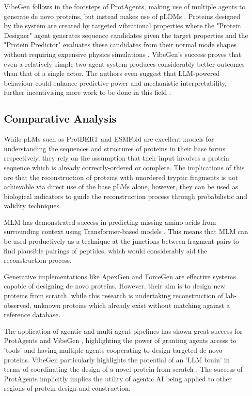 \documentclass[journal]{IEEEtran}
\begin{document}
VibeGen follows in the footsteps of ProtAgents, making use of multiple agents to generate de novo proteins,
but instead makes use of pLDMs \cite{ni2025agenticendtoendnovoprotein}.
Proteins designed by the system are created by targeted vibrational properties where the "Protein Designer"
agent generates sequence candidates given the target properties and the "Protein Predictor" evaluates these
candidates from their normal mode shapes without requiring expensive physics simulations \cite{ni2025agenticendtoendnovoprotein}.
VibeGen's success proves that even a relatively simple two-agent system produces 
considerably better outcomes than that of a single actor. The authors even suggest that LLM-powered behaviour could
enhance predictive power and mechanistic interpretability, further incentivising more work to be done in
this field \cite{ni2025agenticendtoendnovoprotein}.

\subsection{Comparative Analysis}
While pLMs such as ProtBERT \cite{9477085} and ESMFold \cite{lin2023esmfold} are excellent models
for understanding the sequences and structures of proteins in their base forms respectively, they rely on the assumption that their 
input involves a protein sequence which is already correctly-ordered or complete. The implications of this are that the 
reconstruction of proteins with unordered tryptic fragments is not achievable
via direct use of the base pLMs alone, however, they can be used as biological indicators
to guide the reconstruction process through probabilistic and validity techniques.

MLM has demonstrated success in predicting missing amino acids from surrounding
context using Transformer-based models \cite{kharkar2024llmproteins}. This means that
MLM can be used productively as a technique at the junctions between fragment pairs to find plausible pairings of peptides, 
which would considerably aid the reconstruction process.

Generative implementations like ApexGen \cite{xia2025apexgensimultaneousdesignpeptide} and
ForceGen \cite{doi:10.1126/sciadv.adl4000} are effective systems capable of designing de novo
proteins. However, their aim is to design new proteins from scratch, while this research is undertaking
reconstruction of lab-observed, unknown proteins which already exist without matching against a reference database.

The application of agentic and multi-agent pipelines has shown great success for ProtAgents \cite{ghafarollahi2024protagentsproteindiscoverylarge}
and VibeGen \cite{ni2025agenticendtoendnovoprotein}, highlighting the power of granting agents
access to 'tools' and having multiple agents cooperating to design targeted de novo proteins. VibeGen
particularly highlights the potential of an 'LLM brain' in terms of coordinating the design of a novel
protein from scratch \cite{ni2025agenticendtoendnovoprotein}. The success of ProtAgents implicitly 
implies the utility of agentic AI being applied to other regions of protein design and construction.
\end{document}
